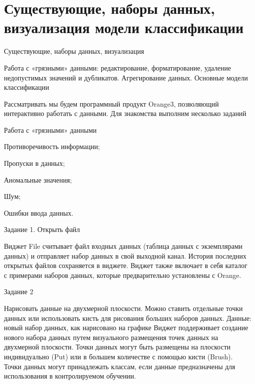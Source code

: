 \documentclass{beamer}
\begin{document}
\section{ Существующие, наборы данных, визуализация модели классификации}

\begin{frame}{Существующие, наборы данных, визуализация}

Работа с «грязными» данными: редактирование, форматирование, 
удаление недопустимых значений и дубликатов. 
Агрегирование данных. Основные модели классификации

Рассматривать мы будем  программный продукт Orange3, позволяющий  интерактивно работать с данными.
Для знакомства выполним несколько заданий



\end{frame}

\begin{frame}{Работа с «грязными» данными}

Противоречивость информации;

Пропуски в данных;

Аномальные значения;

Шум;

Ошибки ввода данных. 

\end{frame}

\begin{frame}{Задание 1. Открыть файл}
  
  
  Виджет File считывает файл входных данных (таблица данных с экземплярами данных) и отправляет набор данных в свой выходной канал. История последних открытых файлов сохраняется в виджете. Виджет также включает в себя каталог с примерами наборов данных, которые предварительно установлены с Orange.

\end{frame}


\begin{frame}{Задание 2}

Нарисовать данные на двухмерной плоскости. Можно ставить отдельные точки данных или использовать 
кисть для рисования больших наборов данных.
Данные: новый набор данных, как нарисовано на графике
Виджет поддерживает создание нового набора данных путем визуального размещения 
точек данных на двухмерной плоскости. Точки данных могут быть размещены на плоскости 
индивидуально (Put) или в большем количестве с помощью кисти (Brush). 
Точки данных могут принадлежать классам, если данные предназначены для использования в контролируемом обучении.  

\end{frame}
\end{document}
